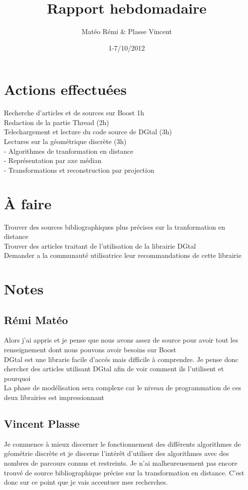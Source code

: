 \documentclass{article}
\title{Rapport hebdomadaire}
\author{Matéo Rémi \& Plasse Vincent}
\date{1-7/10/2012}
\begin{document}
\maketitle

\section{Actions effectuées}
Recherche d'articles et de sources sur Boost 1h \\
Redaction de la partie Thread (2h) \\
Telechargement et lecture du code source de DGtal (3h) \\
Lectures sur la géométrique discrète (3h) \\
 - Algorithmes de tranformation en distance \\
 - Représentation par axe médian \\
 - Transformations et reconstruction par projection\\


\section{À faire}
Trouver des sources bibliographiques plus précises sur la tranformation en distance \\
Trouver des articles traitant de l'utilisation de la librairie DGtal \\
Demander a la communauté utilisatrice leur recommandations de cette librairie \\

\section{Notes}

\subsection{Rémi Matéo}

Alors j'ai appris et je pense que nous avons assez de source pour avoir tout les renseignement dont nous pouvons avoir besoins sur Boost \\
DGtal est une librarie facile d'accés mais difficile à comprendre. Je pense donc chercher des articles utilisant DGtal afin de voir comment ils l'utilisent et pourquoi \\
La phase de modélisation sera complexe car le niveau de programmation de ces deux librairies est impressionnant\\

\subsection{Vincent Plasse}

Je commence à mieux discerner le fonctionnement des différents algorithmes de géométrie discrète et je discerne l'intérêt d'utiliser des algorithmes avec des nombres de parcours connus et restreints. Je n'ai malheureusement pas encore trouvé de source bibliographique précise sur la transformation en distance. C'est donc sur ce point que je vais accentuer mes recherches. \\
\end{document}
